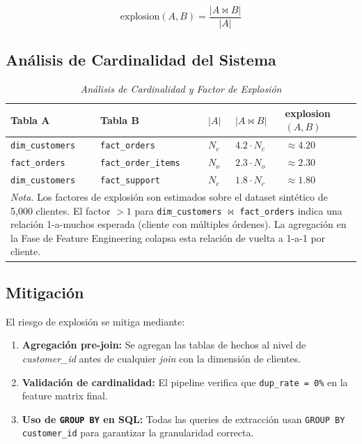 \documentclass[12pt,a4paper]{article}
\begin{document}
\begin{equation}
\text{explosion}(A, B) = \frac{|A \bowtie B|}{|A|}
\end{equation}

\subsection{Análisis de Cardinalidad del Sistema}

\begin{table}[htbp]
\centering
\caption{\textit{Análisis de Cardinalidad y Factor de Explosión}}
\label{tab:cardinalidad}
\begin{tabular}{@{}p{3cm}p{3cm}p{2.5cm}p{2.5cm}p{2.5cm}@{}}
\toprule
\textbf{Tabla A} & \textbf{Tabla B} & \textbf{$|A|$} & \textbf{$|A \bowtie B|$} & \textbf{explosion$(A,B)$} \\
\midrule
\texttt{dim\_customers} & \texttt{fact\_orders} & $N_c$ & $4.2 \cdot N_c$ & $\approx 4.20$ \\
\texttt{fact\_orders} & \texttt{fact\_order\_items} & $N_o$ & $2.3 \cdot N_o$ & $\approx 2.30$ \\
\texttt{dim\_customers} & \texttt{fact\_support} & $N_c$ & $1.8 \cdot N_c$ & $\approx 1.80$ \\
\bottomrule
\multicolumn{5}{p{13.5cm}}{\footnotesize \textit{Nota.} Los factores de explosión son estimados sobre el dataset sintético de 5,000 clientes. El factor $> 1$ para \texttt{dim\_customers} $\bowtie$ \texttt{fact\_orders} indica una relación 1-a-muchos esperada (cliente con múltiples órdenes). La agregación en la Fase de Feature Engineering colapsa esta relación de vuelta a 1-a-1 por cliente.} \\
\end{tabular}
\end{table}

\subsection{Mitigación}

El riesgo de explosión se mitiga mediante:
\begin{enumerate}
    \item \textbf{Agregación pre-join:} Se agregan las tablas de hechos al nivel de \textit{customer\_id} antes de cualquier \textit{join} con la dimensión de clientes.
    \item \textbf{Validación de cardinalidad:} El pipeline verifica que \texttt{dup\_rate = 0\%} en la feature matrix final.
    \item \textbf{Uso de \texttt{GROUP BY} en SQL:} Todas las queries de extracción usan \texttt{GROUP BY customer\_id} para garantizar la granularidad correcta.
\end{enumerate}
\end{document}

